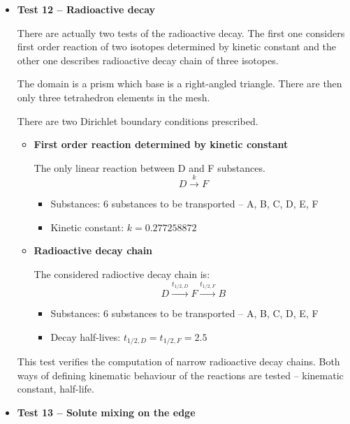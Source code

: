 \documentclass[12pt,a4paper]{report}
\begin{document}
\begin{itemize}

\item \textbf{Test 12 -- Radioactive decay}

There are actually two tests of the radioactive decay. The first one considers first order reaction of two isotopes determined by kinetic constant and the other one describes radioactive decay chain of three isotopes.

The domain is a prism which base is a right-angled triangle. There are then only three tetrahedron elements in the mesh.

There are two Dirichlet boundary conditions prescribed.

\begin{itemize}
\item \textbf{First order reaction determined by kinetic constant}

The only linear reaction between D and F substances.
\[
D\xrightarrow{k}F
\]

\begin{itemize}
  \item Substances: 6 substances to be transported -- A, B, C, D, E, F
  \item Kinetic constant: $k = 0.277258872$
\end{itemize}


\item \textbf{Radioactive decay chain}

The considered radioctive decay chain is:
\[
 D\xrightarrow{t_{1/2,D}}F\xrightarrow{t_{1/2,F}}B
\]

\begin{itemize}
  \item Substances: 6 substances to be transported -- A, B, C, D, E, F
  \item Decay half-lives: $t_{1/2,D} = t_{1/2,F} = 2.5$
\end{itemize}
\end{itemize}

This test verifies the computation of narrow radioactive decay chains. Both ways of defining kinematic behaviour of the reactions are tested -- kinematic constant, half-life.


\item \textbf{Test 13 -- Solute mixing on the edge}


\end{itemize}
\end{document}
